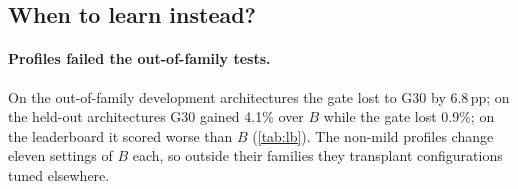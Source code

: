 \documentclass{article}
\newcommand{\pp}{\,pp}
\begin{document}
\subsection{When to learn instead?}\label{sec:learn}

\paragraph{Profiles failed the out-of-family tests.}\label{sec:outoffamily}
On the out-of-family development architectures the gate lost to G30 by 6.8\pp; on the
held-out architectures G30 gained 4.1\% over $B$ while the gate lost 0.9\%; on the leaderboard it scored worse than $B$
(\cref{tab:lb}). The non-mild profiles change eleven settings of $B$ each, so outside their families they transplant
configurations tuned elsewhere.
\end{document}
